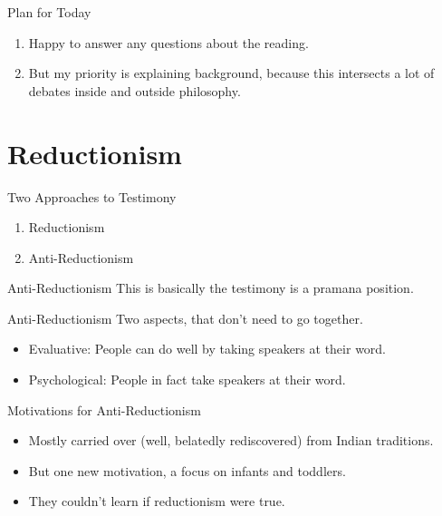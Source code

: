 \documentclass[
  17pt,
  letterpaper,
  ignorenonframetext,
  aspectratio=169,
  handout]{beamer}
\providecommand{\tightlist}{%
  \setlength{\itemsep}{0pt}\setlength{\parskip}{0pt}}\usepackage{longtable,booktabs,array}
\begin{document}
\begin{frame}{Plan for Today}
\protect\hypertarget{plan-for-today}{}
\begin{enumerate}[<+->]
\tightlist
\item
  Happy to answer any questions about the reading.
\item
  But my priority is explaining background, because this intersects a
  lot of debates inside and outside philosophy.
\end{enumerate}
\end{frame}

\hypertarget{reductionism}{%
\section{Reductionism}\label{reductionism}}

\begin{frame}{Two Approaches to Testimony}
\protect\hypertarget{two-approaches-to-testimony}{}
\begin{enumerate}[<+->]
\tightlist
\item
  Reductionism
\item
  Anti-Reductionism
\end{enumerate}
\end{frame}

\begin{frame}{Anti-Reductionism}
\protect\hypertarget{anti-reductionism}{}
This is basically the testimony is a pramana position.
\end{frame}

\begin{frame}{Anti-Reductionism}
\protect\hypertarget{anti-reductionism-1}{}
Two aspects, that don't need to go together.

\begin{itemize}[<+->]
\tightlist
\item
  Evaluative: People can do well by taking speakers at their word.
\item
  Psychological: People in fact take speakers at their word.
\end{itemize}
\end{frame}

\begin{frame}{Motivations for Anti-Reductionism}
\protect\hypertarget{motivations-for-anti-reductionism}{}
\begin{itemize}[<+->]
\tightlist
\item
  Mostly carried over (well, belatedly rediscovered) from Indian
  traditions.
\item
  But one new motivation, a focus on infants and toddlers.
\item
  They couldn't learn if reductionism were true.
\end{itemize}
\end{frame}
\end{document}

